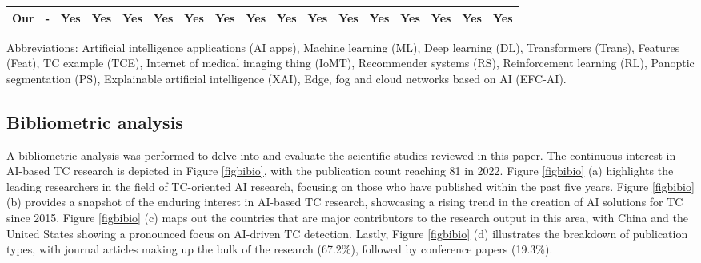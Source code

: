 \documentclass[a4paper,fleqn]{cas-sc}
\begin{document}
\begin{table}[t!]
\begin{tabular}{
m{2mm}
m{3mm}
m{6mm}
m{11mm}
m{4mm}
m{4mm}
m{4mm}
m{4mm}
m{2mm}
m{4mm}
m{4mm}
m{4mm}
m{4mm}
m{4mm}
m{8mm}
m{8mm}
m{5mm}
}
Our & - & Yes & Yes & Yes & Yes & Yes & Yes & Yes & Yes & Yes & Yes & Yes & Yes & Yes & Yes & Yes  \\
\hline
\end{tabular}
\begin{flushleft}
Abbreviations: 
Artificial intelligence applications (AI apps), 
Machine learning (ML),
Deep learning (DL),
Transformers (Trans),
Features (Feat),
\ac{TC} example (TCE),
Internet of medical imaging thing (IoMT), Recommender systems (RS), 
Reinforcement learning (RL), 
Panoptic segmentation (PS), 
Explainable artificial intelligence (XAI), 
Edge, fog and cloud networks based on AI (EFC-AI).  
\end{flushleft}
\end{table}






\subsection{Bibliometric analysis}
A bibliometric analysis was performed to delve into and evaluate the scientific studies reviewed in this paper. The continuous interest in AI-based TC research is depicted in Figure \ref{figbibio}, with the publication count reaching 81 in 2022. Figure \ref{figbibio} (a) highlights the leading researchers in the field of TC-oriented AI research, focusing on those who have published within the past five years. Figure \ref{figbibio} (b) provides a snapshot of the enduring interest in AI-based TC research, showcasing a rising trend in the creation of AI solutions for TC since 2015. Figure \ref{figbibio} (c) maps out the countries that are major contributors to the research output in this area, with China and the United States showing a pronounced focus on AI-driven TC detection. Lastly, Figure \ref{figbibio} (d) illustrates the breakdown of publication types, with journal articles making up the bulk of the research (67.2\%), followed by conference papers (19.3\%).
\end{document}
